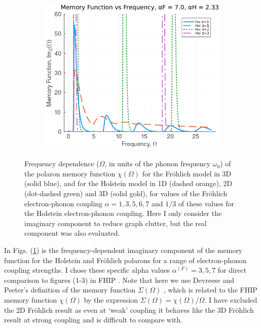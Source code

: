 \begin{figure}
\begin{subfigure}[b]{0.49\textwidth}
    \centering
    \includegraphics[width=\textwidth]{figures/im_mem_freq_7_233.png}
  \end{subfigure}
  \caption{Frequency dependence ($\Omega$, in units of the phonon frequency $\omega_0$) of the polaron memory function $\chi(\Omega)$ for the Fr\"ohlich model in 3D (solid blue), and for the Holstein model in 1D (dashed orange), 2D (dot-dashed green) and 3D (solid gold), for values of the Fr\"ohlich electron-phonon coupling $\alpha = 1, 3, 5,6, 7$ and $1/3$ of these values for the Holstein electron-phonon coupling. Here I only consider the imaginary component to reduce graph clutter, but the real component was also evaluated.} 
  \label{fig:im_mem_freq}
\end{figure}

In Figs. (\ref{fig:im_mem_freq}) is the frequency-dependent imaginary component of the memory function for the Holstein and Fr\"ohlich polarons for a range of electron-phonon coupling strengths. I chose these specific alpha values $\alpha^{(F)} = 3, 5, 7$ for direct comparison to figures (1-3) in FHIP \cite{Feynman1962}. Note that here we use Devreese and Peeter's definition of the memory function $\Sigma(\Omega)$ \cite{Peeters1984}, which is related to the FHIP memory function $\chi(\Omega)$ by the expression $\Sigma(\Omega) = \chi(\Omega) / \Omega$. I have excluded the 2D Fr\"ohlich result as even at `weak' coupling it behaves like the 3D Fr\"ohlich result at strong coupling and is difficult to compare with.
\newline

